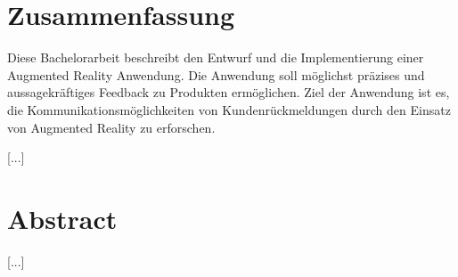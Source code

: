 \section*{Zusammenfassung}

Diese Bachelorarbeit beschreibt den Entwurf und die Implementierung einer Augmented Reality Anwendung. Die Anwendung soll möglichst präzises und aussagekräftiges Feedback zu Produkten ermöglichen.
Ziel der Anwendung ist es, die Kommunikationsmöglichkeiten von Kundenrückmeldungen durch den Einsatz von Augmented Reality zu erforschen.

[...]

\section*{Abstract}

[...]

